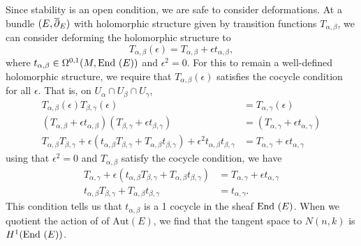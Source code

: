 	Since stability is an open condition, we are safe to consider deformations. At a bundle $(E,\overline{\partial}_E)$ with holomorphic structure given by transition functions $T_{\alpha,\beta}$, we can consider deforming the holomorphic structure to 
	\begin{equation}
		T_{\alpha,\beta}(\epsilon) = T_{\alpha,\beta} + \epsilon t_{\alpha,\beta},
	\end{equation}
	where $t_{\alpha,\beta} \in \Omega^{0,1}(M,\text{End }(E))$ and $\epsilon^2=0$. For this to remain a well-defined holomorphic structure, we require that $T_{\alpha,\beta}(\epsilon)$ satisfies the cocycle condition for all $\epsilon$. That is, on $U_{\alpha}\cap U_{\beta}\cap U_{\gamma}$,
	\begin{align*}
		T_{\alpha,\beta}(\epsilon)T_{\beta,\gamma}(\epsilon) &= T_{\alpha,\gamma}(\epsilon)\\
		\left(T_{\alpha,\beta} + \epsilon t_{\alpha,\beta} \right)
		\left(T_{\beta,\gamma} + \epsilon t_{\beta,\gamma} \right) &=
		\left(T_{\alpha,\gamma} + \epsilon t_{\alpha,\gamma} \right)\\
		T_{\alpha,\beta}T_{\beta,\gamma} + \epsilon(t_{\alpha,\beta}T_{\beta,\gamma} + T_{\alpha,\beta} t_{\beta,\gamma}) + \epsilon^2 t_{\alpha,\beta}t_{\beta,\gamma} &= T_{\alpha,\gamma} + \epsilon t_{\alpha,\gamma}
	\end{align*}
	using that $\epsilon^2 = 0$ and $T_{\alpha,\beta}$ satisfy the cocycle condition, we have
	\begin{align*}
		T_{\alpha,\gamma} + \epsilon(t_{\alpha,\beta} T_{\beta,\gamma} + T_{\alpha,\beta} t_{\beta,\gamma}) &= T_{\alpha,\gamma} + \epsilon t_{\alpha,\gamma}\\
		t_{\alpha,\beta} T_{\beta,\gamma} + T_{\alpha,\beta} t_{\beta,\gamma} &= t_{\alpha,\gamma}.
	\end{align*}
	This condition tells us that $t_{\alpha,\beta}$ is a 1 cocycle in the sheaf $\text{End }(E)$. When we quotient the action of of $\text{Aut}(E)$, we find that the tangent space to $N(n,k)$ is $H^1(\text{End }(E))$. 
	
